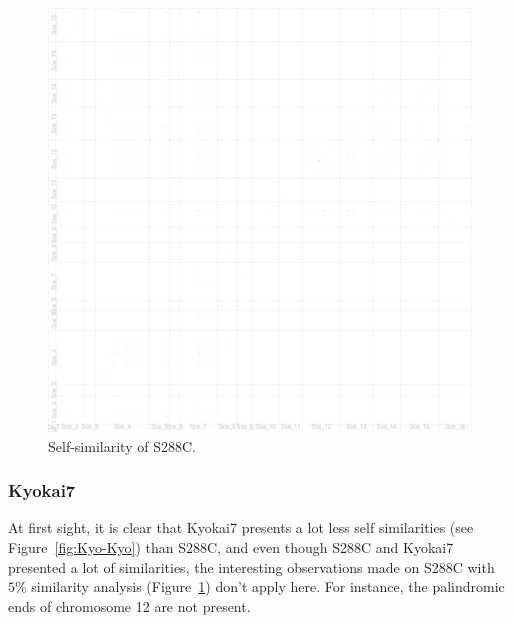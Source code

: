 \documentclass{article}
\begin{document}
\begin{figure}
	\hspace{-1cm}
	\includegraphics[width=1.1\textwidth]{figs/Sce_Sce.eps}
	\caption{Self-similarity of S288C.\label{fig:Sce-Sce}}
\end{figure}

\subsubsection{Kyokai7}

At first sight, it is clear that Kyokai7 presents a lot less self similarities (see Figure~\ref{fig:Kyo-Kyo})
than S288C, and even though S288C and Kyokai7 presented a lot of similarities, the interesting observations
made on S288C with $5\%$ similarity analysis (Figure~\ref{fig:Sce-Sce}) don't apply here. For instance,
the palindromic ends of chromosome 12 are not present.
\end{document}
